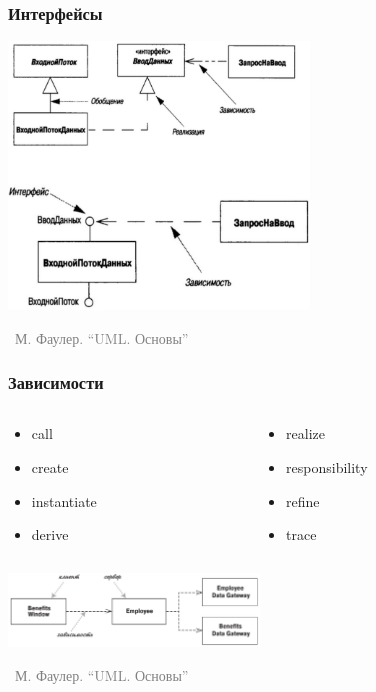 \documentclass[xetex,mathserif,serif]{beamer}
\newcommand{\attribution}[1] {
	\vspace{-5mm}\begin{flushright}\begin{scriptsize}\textcolor{gray}{\textcopyright\, #1}\end{scriptsize}\end{flushright}
}
\begin{document}
	\begin{frame}
		\frametitle{Интерфейсы}
		\begin{center}
			\includegraphics[width=0.6\textwidth]{interfaces.png}
			\attribution{М. Фаулер. ``UML. Основы''}
		\end{center}
	\end{frame}

	\begin{frame}
		\frametitle{Зависимости}
		\begin{columns}
			\begin{column}{0.5\textwidth}
				\begin{itemize}
					\item call
					\item create
					\item instantiate
					\item derive 
				\end{itemize}
			\end{column}
			\begin{column}{0.5\textwidth}
				\begin{itemize}
					\item realize
					\item responsibility
					\item refine 
					\item trace
				\end{itemize}
			\end{column}
		\end{columns}
		\vspace{7mm}
		\begin{center}
			\includegraphics[width=0.5\textwidth]{dependencies.png}
			\attribution{М. Фаулер. ``UML. Основы''}
		\end{center}
	\end{frame}
\end{document}

